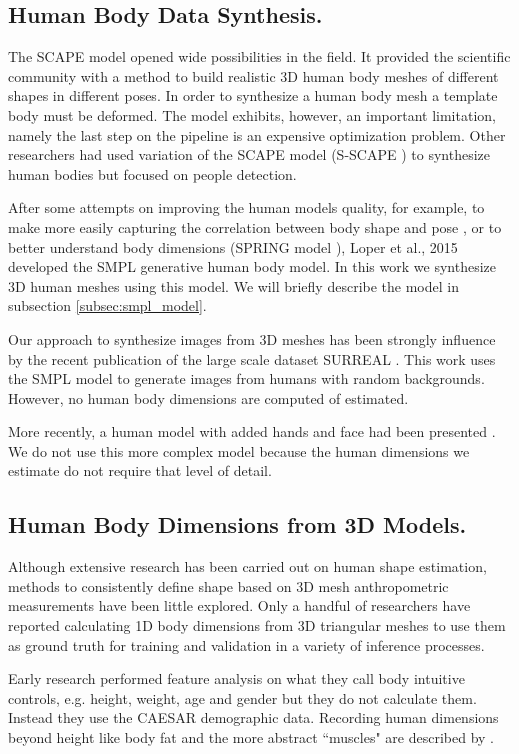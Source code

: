 \documentclass[runningheads, orivec]{llncs}
\begin{document}
\subsection{Human Body Data Synthesis.}
The SCAPE model\cite{Anguelov.2005} opened wide possibilities in the field. It 
provided the scientific community with a method to build realistic 3D human 
body meshes of different shapes in different poses. In order to synthesize a 
human body mesh a template body must be deformed. The model exhibits, however, an important limitation, namely the last 
step on the pipeline is an expensive optimization problem. Other researchers had used variation of the SCAPE model (S-SCAPE \cite{Pishchulin.2017}) to synthesize human bodies but focused on people detection.

After some attempts on improving the human models quality, for example, to make 
more 
easily capturing the correlation between body shape and pose 
\cite{HaslerSSRS09}, or to better understand body dimensions (SPRING model 
\cite{Yang.2014}), Loper et al., 2015 \cite{Loper.2015} developed the SMPL generative 
human body model. In this work we synthesize 3D human meshes using this 
model. We will briefly describe the model in subsection \ref{subsec:smpl_model}.

Our approach to synthesize images from 3D meshes has been strongly influence by the recent publication of the large scale dataset SURREAL \cite{varol17_surreal}. This work uses the SMPL model 
to generate images 
from humans with random backgrounds. However, no human body dimensions are computed of estimated.

More recently, a human model with added hands and face had been presented \cite{Joo.2018}. We do not use this more complex model 
because the human dimensions we estimate do not require that level 
of detail.

\subsection{Human Body Dimensions from 3D Models.}
Although extensive research has been carried out on human shape estimation, 
methods to consistently define shape based on 3D mesh 
anthropometric measurements have been little explored. Only a handful of researchers 
have 
reported calculating 1D body dimensions from 3D triangular meshes to use them as ground truth for training and validation in a variety of inference processes.
 
Early research performed feature analysis on what they 
call body intuitive controls, e.g. height, weight, age and gender \cite{Allen.2003}  but they do not 
calculate them. Instead they use the CAESAR demographic data. Recording human dimensions beyond height like body fat and the more abstract ``muscles" are described by \cite{HaslerSSRS09}.
\end{document}

